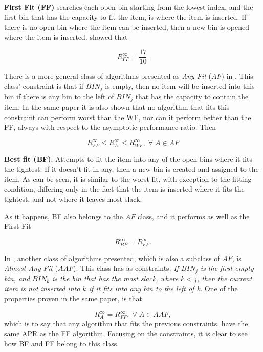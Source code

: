 \textbf{First Fit (FF)} searches each open bin starting from the lowest index, and the first bin that has the capacity to fit the item, is where the item is inserted. If there is no open bin where the item can be inserted, then a new bin is opened where the item is inserted. \cite{johnson1974worst} showed that 

\begin{equation}
    R_{FF}^\infty = \frac{17}{10}.
\end{equation}

There is a more general class of algorithms presented as \textit{Any Fit} ($AF$) in \cite{johnson1974fast}. This class' constraint is that if $BIN_j$ is empty, then no item will be inserted into this bin if there is any bin to the left of $BIN_j$ that has the capacity to contain the item. In the same paper it is also shown that no algorithm that fits this constraint can perform worst than the WF, nor can it perform better than the FF, always with respect to the asymptotic performance ratio. Then

\begin{equation}
    R_{FF}^\infty \leq R_A^\infty \leq R_{WF}^\infty, \; \forall \; A \in AF
\end{equation}

\textbf{Best fit (BF)}: Attempts to fit the item into any of the open bins where it fits the tightest. If it doesn't fit in any, then a new bin is created and assigned to the item. As can be seen, it is similar to the worst fit, with exception to the fitting condition, differing only in the fact that the item is inserted where it fits the tightest, and not where it leaves most slack.

As it happens, BF also belongs to the $AF$ class, and it performs as well as the First Fit

\begin{equation}
    R_{BF}^\infty = R_{FF}^\infty.
\end{equation}

In \cite{johnson1974fast}, another class of algorithms presented, which is also a subclass of $AF$, is \textit{Almost Any Fit} ($AAF$). This class has as constraints: 
\textit{If $BIN_j$ is the first empty bin, and $BIN_k$ is the bin that has the most slack, where $k < j$, then the current item is not inserted into $k$ if it fits into any bin to the left of k.} One of the properties proven in the same paper, is that 

\begin{equation}
    R_A^\infty = R_{FF}^\infty, \; \forall \; A \in AAF,
\end{equation}
which is to say that any algorithm that fits the previous constraints, have the same APR as the FF algorithm. Focusing on the constraints, it is clear to see how BF and FF belong to this class. 

